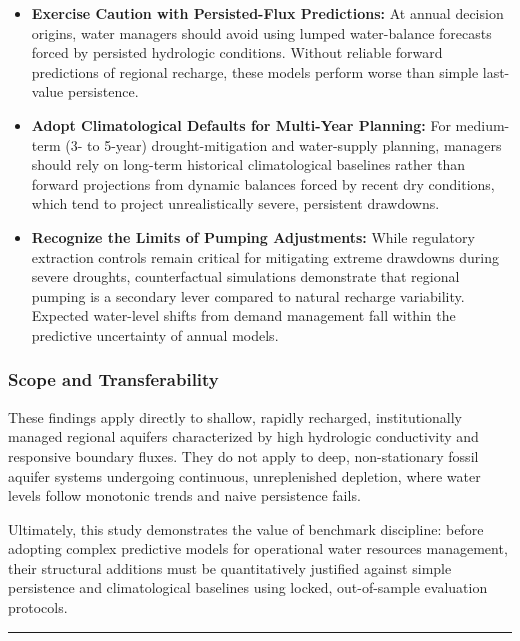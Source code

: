 \documentclass[11pt]{article}
\providecommand{\tightlist}{\setlength{\itemsep}{0.2em}\setlength{\parskip}{0pt}}
\begin{document}
\begin{itemize}
\tightlist
\item
  \textbf{Exercise Caution with Persisted-Flux Predictions:} At annual
  decision origins, water managers should avoid using lumped
  water-balance forecasts forced by persisted hydrologic conditions.
  Without reliable forward predictions of regional recharge, these
  models perform worse than simple last-value persistence.
\item
  \textbf{Adopt Climatological Defaults for Multi-Year Planning:} For
  medium-term (3- to 5-year) drought-mitigation and water-supply
  planning, managers should rely on long-term historical climatological
  baselines rather than forward projections from dynamic balances forced
  by recent dry conditions, which tend to project unrealistically
  severe, persistent drawdowns.
\item
  \textbf{Recognize the Limits of Pumping Adjustments:} While regulatory
  extraction controls remain critical for mitigating extreme drawdowns
  during severe droughts, counterfactual simulations demonstrate that
  regional pumping is a secondary lever compared to natural recharge
  variability. Expected water-level shifts from demand management fall
  within the predictive uncertainty of annual models.
\end{itemize}

\subsubsection{Scope and
Transferability}\label{scope-and-transferability}

These findings apply directly to shallow, rapidly recharged,
institutionally managed regional aquifers characterized by high
hydrologic conductivity and responsive boundary fluxes. They do not
apply to deep, non-stationary fossil aquifer systems undergoing
continuous, unreplenished depletion, where water levels follow monotonic
trends and naive persistence fails.

Ultimately, this study demonstrates the value of benchmark discipline:
before adopting complex predictive models for operational water
resources management, their structural additions must be quantitatively
justified against simple persistence and climatological baselines using
locked, out-of-sample evaluation protocols.

\begin{center}\rule{0.5\linewidth}{0.5pt}\end{center}
\end{document}
